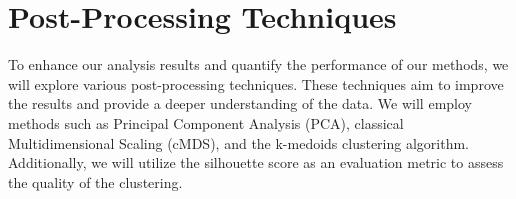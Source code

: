 \newpage
\section{Post-Processing Techniques}
\label{sec:post-processing}

To enhance our analysis results and quantify the performance of our methods, we will explore various post-processing techniques. These techniques aim to improve the results and provide a deeper understanding of the data. We will employ methods such as Principal Component Analysis (PCA), classical Multidimensional Scaling (cMDS), and the k-medoids clustering algorithm. Additionally, we will utilize the silhouette score as an evaluation metric to assess the quality of the clustering.






\newpage


